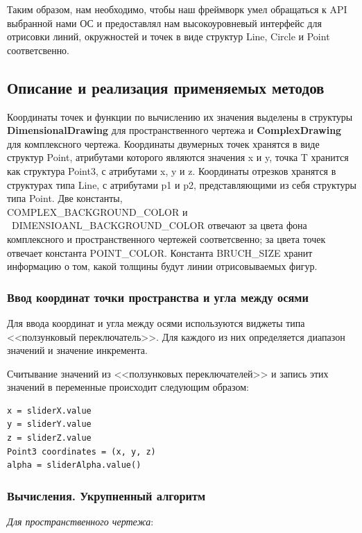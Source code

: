 \documentclass[13pt]{extarticle}
\begin{document}
Таким образом, нам необходимо, чтобы наш фреймворк умел обращаться к API выбранной нами ОС и предоставлял нам высокоуровневый интерфейс для отрисовки линий, окружностей и точек в виде структур Line, Circle и Point соответсвенно.


\subsection{Описание и реализация применяемых методов}
Координаты точек и функции по вычислению их значения выделены в структуры \textbf{DimensionalDrawing} для пространственного чертежа и \textbf{ComplexDrawing} для комплексного чертежа. Координаты двумерных точек хранятся в виде структур Point, атрибутами которого являются значения x и y, точка T хранится как структура Point3, с атрибутами x, y и z. Координаты отрезков хранятся в структурах типа Line, с атрибутами p1 и p2, представляющими из себя структуры типа Point. Две константы,\\ COMPLEX\_BACKGROUND\_COLOR и \ DIMENSIOANL\_BACKGROUND\_COLOR отвечают за цвета фона комплексного и пространственного чертежей соответсвенно; за цвета точек отвечает константа POINT\_COLOR. Константа BRUCH\_SIZE хранит информацию о том, какой толщины будут линии отрисовываемых фигур.

\subsubsection{Ввод координат точки пространства и угла между осями}
Для ввода координат и угла между осями используются виджеты типа <<ползунковый переключатель>>. Для каждого из них определяется диапазон значений и значение инкремента.

Считывание значений из <<ползунковых переключателей>> и запись этих значений в переменные происходит следующим образом:
\lstset {language=C++}
\begin{lstlisting}
x = sliderX.value
y = sliderY.value
z = sliderZ.value
Point3 coordinates = (x, y, z)
alpha = sliderAlpha.value()
\end{lstlisting}

\subsubsection{Вычисления. Укрупненный алгоритм}
\emph{Для пространственного чертежа}:
\end{document}
